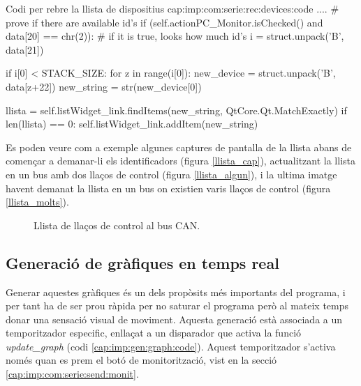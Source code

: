 \begin{code_python}{Codi per rebre la llista de dispositius }{cap:imp:com:serie:rec:devices:code}
....
# prove if there are available id's
if (self.actionPC_Monitor.isChecked() and data[20] == chr(2)):
    # if it is true, looks how much id's
    i  = struct.unpack('B', data[21])

    if i[0] < STACK_SIZE:
        for z in range(i[0]):
            new_device = struct.unpack('B', data[z+22])
            new_string = str(new_device[0])
            
            llista = self.listWidget_link.findItems(new_string, QtCore.Qt.MatchExactly)
            if len(llista) == 0:
                self.listWidget_link.addItem(new_string)
\end{code_python}

Es poden veure com a exemple algunes captures de pantalla de la llista abans de començar a demanar-li els identificadors (figura \ref{llista_cap}), actualitzant la llista en un bus amb dos llaços de control (figura \ref{llista_algun}), i la ultima imatge havent demanat la llista en un bus on existien varis llaços de control (figura \ref{llista_molts}).

\begin{figure}[ht!]

	\caption{Llista de llaços de control al bus CAN.}
    \label{fig:comparacio:llista}
\end{figure}

\FloatBarrier

\subsection{Generació de gràfiques en temps real}\label{cap:imp:gen:graph}

Generar aquestes gràfiques és un dels propòsits més importants del programa, i per tant ha de ser prou ràpida per no saturar el programa però al mateix temps donar una sensació visual de moviment.
Aquesta generació està associada a un temporitzador especific, enllaçat a un disparador que activa la funció \emph{update\_graph} (codi \ref{cap:imp:gen:graph:code}).
Aquest temporitzador s'activa només quan es prem el botó de monitorització, vist en la secció \ref{cap:imp:com:serie:send:monit}.

